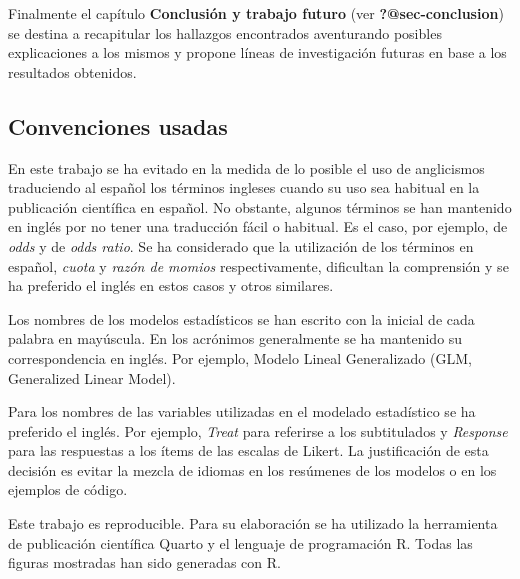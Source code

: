\documentclass[
  letterpaper,
  DIV=11,
  numbers=noendperiod]{scrartcl}
\begin{document}
Finalmente el capítulo \textbf{Conclusión y trabajo futuro} (ver
\textbf{?@sec-conclusion}) se destina a recapitular los hallazgos
encontrados aventurando posibles explicaciones a los mismos y propone
líneas de investigación futuras en base a los resultados obtenidos.

\hypertarget{convenciones-usadas}{%
\subsection{Convenciones usadas}\label{convenciones-usadas}}

En este trabajo se ha evitado en la medida de lo posible el uso de
anglicismos traduciendo al español los términos ingleses cuando su uso
sea habitual en la publicación científica en español. No obstante,
algunos términos se han mantenido en inglés por no tener una traducción
fácil o habitual. Es el caso, por ejemplo, de \emph{odds} y de
\emph{odds ratio}. Se ha considerado que la utilización de los términos
en español, \emph{cuota} y \emph{razón de momios} respectivamente,
dificultan la comprensión y se ha preferido el inglés en estos casos y
otros similares.

Los nombres de los modelos estadísticos se han escrito con la inicial de
cada palabra en mayúscula. En los acrónimos generalmente se ha mantenido
su correspondencia en inglés. Por ejemplo, Modelo Lineal Generalizado
(GLM, Generalized Linear Model).

Para los nombres de las variables utilizadas en el modelado estadístico
se ha preferido el inglés. Por ejemplo, \emph{Treat} para referirse a
los subtitulados y \emph{Response} para las respuestas a los ítems de
las escalas de Likert. La justificación de esta decisión es evitar la
mezcla de idiomas en los resúmenes de los modelos o en los ejemplos de
código.

Este trabajo es reproducible. Para su elaboración se ha utilizado la
herramienta de publicación científica Quarto y el lenguaje de
programación R. Todas las figuras mostradas han sido generadas con R.
\end{document}
